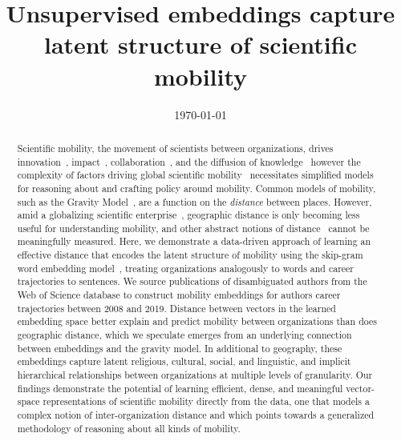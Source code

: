 \documentclass[12pt]{article} %
\begin{document}

\title{Unsupervised embeddings capture latent structure of scientific mobility} %
\date{\today}
\maketitle %

%
%

\begin{abstract}

Scientific mobility, the movement of scientists between organizations, drives innovation~\autocite{braunerhjelm2020labor, kaiser2018innovation, armano2017innovation}, impact~\autocite{sugimoto2017mostimpact, petersen2018multiscale, jonkers2013return, franzoni2014advantage}, collaboration~\autocite{rodrigues2016mobility}, and the diffusion of knowledge~\autocite{braunerhjelm2020labor, azoulay2011diffusion, morgan2018prestige} however the complexity of factors driving global scientific mobility~\autocite{robinson2019mobility, vannoorden2012mobility, deville2014career, ackers2008mobility, scott2015dynamics} necessitates simplified models for reasoning about and crafting policy around mobility. 
Common models of mobility, such as the Gravity Model~\autocite{curiel2018citygravity, lewer2008immigrationgravity, jung2008highwaygravity, hong2016busgravity, truscott2012epidemicgravity, xia2005measlesgravity, simini2012universal}, are a function on the \textit{distance} between places.
However, amid a globalizing scientific enterprise~\autocite{czaika2018globalisation}, geographic distance is only becoming less useful for understanding mobility, and other abstract notions of distance~\autocite{boschma2005proximity} cannot be meaningfully measured.
Here, we demonstrate a data-driven approach of learning an effective distance that encodes the latent structure of mobility using the skip-gram word embedding model~\autocite{mikolov2013word2vec}, treating organizations analogously to words and career trajectories to sentences.
We source publications of disambiguated authors from the Web of Science database to construct mobility embeddings for authors career trajectories between 2008 and 2019. 
Distance between vectors in the learned embedding space better explain and predict mobility between organizations than does geographic distance, which we speculate emerges from an underlying connection between embeddings and the gravity model.
In additional to geography, these embeddings capture latent religious, cultural, social, and linguistic, and implicit hierarchical relationships between organizations at multiple levels of granularity.
Our findings demonstrate the potential of learning efficient, dense, and meaningful vector-space representations of scientific mobility directly from the data, one that models a complex notion of inter-organization distance and which points towards a generalized methodology of reasoning about all kinds of mobility. 

\end{abstract}
\end{document}
